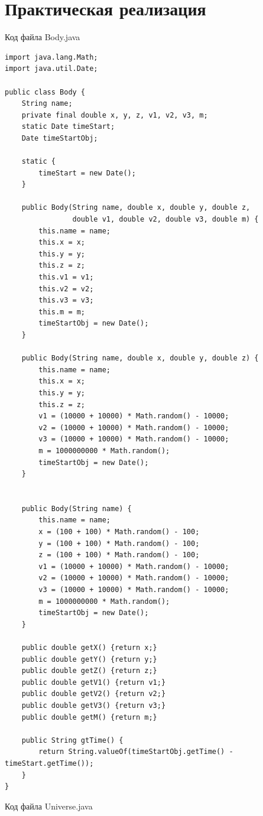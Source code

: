 \documentclass[a4paper, 14pt]{extarticle}
\begin{document}
\section{Практическая реализация}
Код файла Body.java
\begin{lstlisting}
import java.lang.Math;
import java.util.Date;

public class Body {
    String name;
    private final double x, y, z, v1, v2, v3, m;
    static Date timeStart;
    Date timeStartObj;

    static {
        timeStart = new Date();
    }

    public Body(String name, double x, double y, double z,
                double v1, double v2, double v3, double m) {
        this.name = name;
        this.x = x;
        this.y = y;
        this.z = z;
        this.v1 = v1;
        this.v2 = v2;
        this.v3 = v3;
        this.m = m;
        timeStartObj = new Date();
    }

    public Body(String name, double x, double y, double z) {
        this.name = name;
        this.x = x;
        this.y = y;
        this.z = z;
        v1 = (10000 + 10000) * Math.random() - 10000;
        v2 = (10000 + 10000) * Math.random() - 10000;
        v3 = (10000 + 10000) * Math.random() - 10000;
        m = 1000000000 * Math.random();
        timeStartObj = new Date();
    }


    public Body(String name) {
        this.name = name;
        x = (100 + 100) * Math.random() - 100;
        y = (100 + 100) * Math.random() - 100;
        z = (100 + 100) * Math.random() - 100;
        v1 = (10000 + 10000) * Math.random() - 10000;
        v2 = (10000 + 10000) * Math.random() - 10000;
        v3 = (10000 + 10000) * Math.random() - 10000;
        m = 1000000000 * Math.random();
        timeStartObj = new Date();
    }

    public double getX() {return x;}
    public double getY() {return y;}
    public double getZ() {return z;}
    public double getV1() {return v1;}
    public double getV2() {return v2;}
    public double getV3() {return v3;}
    public double getM() {return m;}

    public String gtTime() {
        return String.valueOf(timeStartObj.getTime() - timeStart.getTime());
    }
}
\end{lstlisting}
\par
Код файла Universe.java
\end{document}

